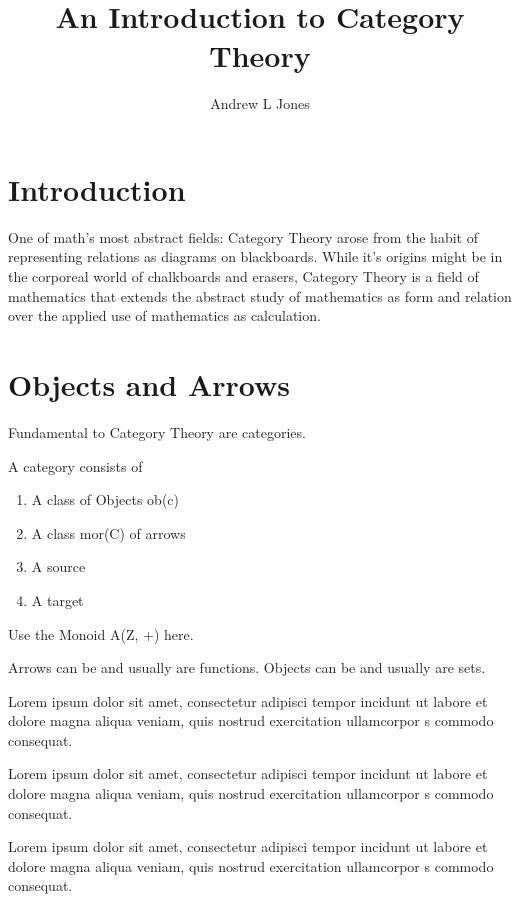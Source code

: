 \documentclass{article}
\title{An Introduction to Category Theory}
\author{Andrew L Jones}\date{}
\begin{document}
\maketitle



\section*{Introduction}
One of math's most abstract fields: Category Theory arose from the habit of representing relations as diagrams on blackboards. While it's origins might be in the corporeal world of chalkboards and erasers, Category Theory is a field of mathematics that extends the abstract study of mathematics as form and relation over the applied use of mathematics as calculation.


\section{Objects and Arrows}
Fundamental to Category Theory are categories.
\begin{definition}
A category consists of
\begin{enumerate}
  \item A class of Objects ob(c)
  \item A class mor(C) of arrows
  \item A source
  \item A target
  \end{enumerate}
\end{definition}
\begin{example}
Use the Monoid A(Z, +) here.
\end{example}
Arrows can be and usually are functions. Objects can be and usually are sets.

Lorem ipsum dolor sit amet, consectetur adipisci tempor incidunt ut labore et dolore magna aliqua veniam, quis nostrud exercitation ullamcorpor s commodo consequat. 

\begin{definition}\label{def:lorem}
	Lorem ipsum dolor sit amet, consectetur adipisci tempor incidunt ut labore et dolore magna aliqua veniam, quis nostrud exercitation ullamcorpor s commodo consequat.
\end{definition}

Lorem ipsum dolor sit amet, consectetur adipisci tempor incidunt ut labore et dolore magna aliqua veniam, quis nostrud exercitation ullamcorpor s commodo consequat. 
\end{document}
